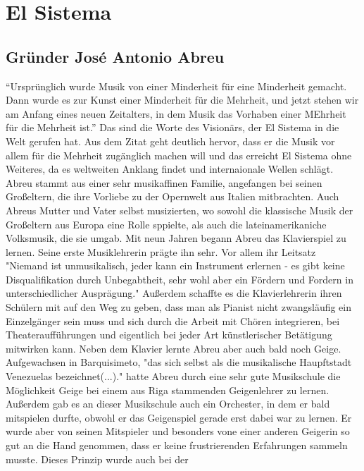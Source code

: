 \section{El Sistema}

\subsection{Gründer José Antonio Abreu}
\enquote{Ursprünglich wurde Musik von einer Minderheit für eine Minderheit
gemacht. Dann wurde es zur Kunst einer Minderheit für die Mehrheit, und jetzt
stehen wir am Anfang eines neuen Zeitalters, in dem Musik das Vorhaben einer
MEhrheit für die Mehrheit ist.} \autocite[5]{kaufmann:el_sistema} Das sind die
Worte des Visionärs, der El Sistema in die Welt gerufen hat. Aus dem Zitat geht
deutlich hervor, dass er die Musik vor allem für die Mehrheit zugänglich machen
will und das erreicht El Sistema ohne Weiteres, da es weltweiten Anklang findet
und internaionale Wellen schlägt. Abreu stammt aus einer sehr musikaffinen
Familie, angefangen bei seinen Großeltern, die ihre Vorliebe zu der Opernwelt
aus Italien mitbrachten. Auch Abreus Mutter und Vater selbst musizierten, wo
sowohl die klassische Musik der Großeltern aus Europa eine Rolle sppielte, als
auch die lateinamerikaniche Volksmusik, die sie umgab. Mit neun Jahren begann
Abreu das Klavierspiel zu lernen. Seine erste Musiklehrerin prägte ihn sehr. Vor
allem ihr Leitsatz "Niemand ist unmusikalisch, jeder kann ein Instrument
erlernen - es gibt keine Disqualifikation durch Unbegabtheit, sehr wohl aber ein
Fördern und Fordern in unterschiedlicher Ausprägung."
\autocite[20]{kaufmann:el_sistema} Außerdem schaffte es die Klavierlehrerin
ihren Schülern mit auf den Weg zu geben, dass man als Pianist nicht zwangsläufig
ein Einzelgänger sein muss und sich durch die Arbeit mit Chören integrieren, bei
Theateraufführungen und eigentlich bei jeder Art künstlerischer Betätigung
mitwirken kann. Neben dem Klavier lernte Abreu aber auch bald noch Geige.
Aufgewachsen in Barquisimeto, "das sich selbst als die musikalische Haupftstadt
Venezuelas bezeichnet(...)." \autocite[22]{kaufmann:el_sistema} hatte Abreu
durch eine sehr gute Musikschule die Möglichkeit Geige bei einem aus Riga
stammenden Geigenlehrer zu lernen. Außerdem gab es an dieser Musikschule auch
ein Orchester, in dem er bald mitspielen durfte, obwohl er das Geigenspiel
gerade erst dabei war zu lernen. Er wurde aber von seinen Mitspieler und
besonders vone einer anderen Geigerin so gut an die Hand genommen, dass er keine
frustrierenden Erfahrungen sammeln musste. Dieses Prinzip wurde auch bei der
